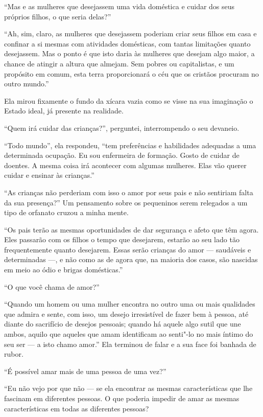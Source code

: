 ``Mas e as mulheres que desejassem uma vida doméstica e cuidar dos seus
próprios filhos, o que seria delas?''

``Ah, sim, claro, as mulheres que desejassem poderiam criar seus filhos
em casa e confinar a si mesmas com atividades domésticas, com tantas
limitações quanto desejassem. Mas o ponto é que isto daria às mulheres
que desejam algo maior, a chance de atingir a altura que almejam. Sem
pobres ou capitalistas, e um propósito em comum, esta terra
proporcionará o céu que os cristãos procuram no outro mundo.''

Ela mirou fixamente o fundo da xícara vazia como se visse na sua
imaginação o Estado ideal, já presente na realidade.

``Quem irá cuidar das crianças?'', perguntei, interrompendo o seu
devaneio.

``Todo mundo'', ela respondeu, ``tem preferências e habilidades
adequadas a uma determinada ocupação. Eu sou enfermeira de formação.
Gosto de cuidar de doentes. A mesma coisa irá acontecer com algumas
mulheres. Elas vão querer cuidar e ensinar às crianças.'' 

``As crianças não perderiam com isso o amor por seus pais e não
sentiriam falta da sua presença?'' Um pensamento sobre os pequeninos
serem relegados a um tipo de orfanato cruzou a minha mente.

``Os pais terão as mesmas oportunidades de dar segurança e afeto que têm
agora. Eles passarão com os filhos o tempo que desejarem, estarão ao seu
lado tão frequentemente quanto desejarem. Essas serão crianças do amor
--- saudáveis e determinadas ---, e não como as de agora que, na maioria
dos casos, são nascidas em meio ao ódio e brigas domésticas.''

``O que você chama de amor?''

``Quando um homem ou uma mulher encontra no outro uma ou mais qualidades
que admira e sente, com isso, um desejo irresistível de fazer bem à
pessoa, até diante do sacrifício de desejos pessoais; quando há aquele
algo sutil que une ambos, aquilo que aqueles que amam identificam ao
senti"-lo no mais íntimo do seu ser --- a isto chamo amor.'' Ela terminou
de falar e a sua face foi banhada de rubor.

``É possível amar mais de uma pessoa de uma vez?''

``Eu não vejo por que não --- se ela encontrar as mesmas características
que lhe fascinam em diferentes pessoas. O que poderia impedir de amar as
mesmas características em todas as diferentes pessoas?

